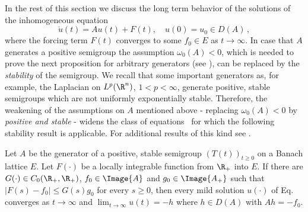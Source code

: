 In the rest of this section we discuss the long term behavior of the solutions of the inhomogeneous equation
\begin{equation}\label{eq:c4-1.6}
\dot{u}(t) = Au(t) + F(t), \quad u(0) = u_{0} \in D(A)\,,
\end{equation}
where the forcing term $F(t)$ converges to some $f_{0} \in E$ as $t \to \infty$.
In case that $A$ generates a positive semigroup the assumption \emph{$\omega_{0}(A) < 0$}, which is needed to prove the next proposition for arbitrary generators (see \textcite[ Theorem~4.4.4]{pazy:1983}), can be replaced by the \emph{stability} of the semigroup.
We recall that some important generators as, for example, the Laplacian on $L^{p}(\R^{n})$, $1 < p < \infty$, generate positive, stable semigroups which are not uniformly exponentially stable.
Therefore, the weakening of the assumptions on $A$ mentioned above - \ie  replacing \emph{$\omega_{0}(A) < 0$} by \emph{positive and stable} - widens the class of equations~ for which the following stability result is applicable.
For additional results of this kind see \textcite{neubrander:1985b}.
\begin{proposition}\label{prop:c4-1.11}
Let $A$ be the generator of a positive, stable semigroup $(T(t))_{t \geq 0}$ on a Banach lattice $E$.
Let $F(\cdot)$ be a locally integrable function from $\R_{+}$ into $E$.
If there are $G(\cdot) \in C_{0}(\R_{+},\R_{+})$, $f_{0} \in  \Image{A}$ and $g_{0} \in \Image{A_{+}}$ such that $|F(s) - f_{0}| \leq G(s)g_{0}$ for every $s \geq 0$, then every mild solution $u(\cdot)$ of Eq.~ converges as $t \to \infty$ and $\lim_{t \to \infty} u(t) = -h$ where $h \in D(A)$ with $Ah = -f_{0}$.
\end{proposition}
